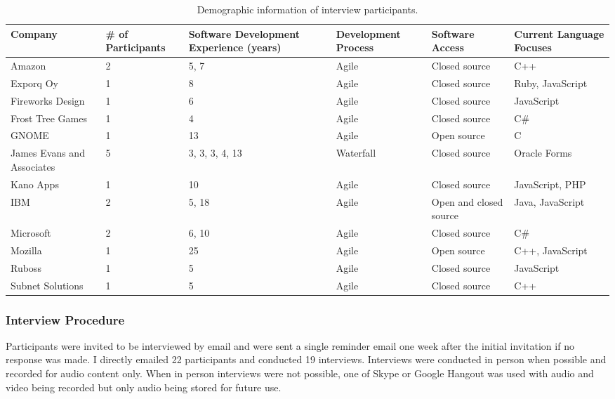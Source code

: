 \begin{table*}[tb!]
\begin{center}
\begin{tabular}{| p{2cm} | p{2cm} | p{2cm} | p{2cm} | p{2cm} | p{2cm} |}
\hline
Company & \# of Participants & Software Development Experience (years) & Development Process & Software Access & Current Language Focuses \\
\hline
\hline
Amazon & 2 & 5, 7 & Agile & Closed source & C++ \\ \hline
Exporq Oy & 1 & 8 & Agile & Closed source & Ruby, JavaScript \\ \hline
Fireworks Design & 1 & 6 & Agile & Closed source & JavaScript \\ \hline
Frost Tree Games & 1 & 4 & Agile & Closed source & C\# \\ \hline
GNOME & 1 & 13 & Agile & Open source & C \\ \hline
James Evans and Associates & 5 & 3, 3, 3, 4, 13 & Waterfall & Closed source & Oracle Forms \\ \hline
Kano Apps & 1 & 10 & Agile & Closed source & JavaScript, PHP \\ \hline
IBM & 2 & 5, 18 & Agile & Open and closed source & Java, JavaScript \\ \hline
Microsoft & 2 & 6, 10 & Agile & Closed source & C\# \\ \hline
Mozilla & 1 & 25 & Agile & Open source & C++, JavaScript \\ \hline
Ruboss & 1 & 5 & Agile & Closed source & JavaScript \\ \hline 
Subnet Solutions & 1 & 5 & Agile & Closed source & C++ \\ \hline
\end{tabular}
\end{center}
\caption{Demographic information of interview participants.\label{tab:demo}}
\end{table*}

\subsubsection{Interview Procedure}

Participants were invited to be interviewed by email and were sent a single reminder email one week
after the initial invitation if no response was made. I directly emailed 22 participants and  conducted
19 interviews. Interviews were conducted in person when possible and recorded for audio content only. When in person
interviews were not possible, one of Skype or Google Hangout was used with audio and video being recorded but only
audio being stored for future use. 

